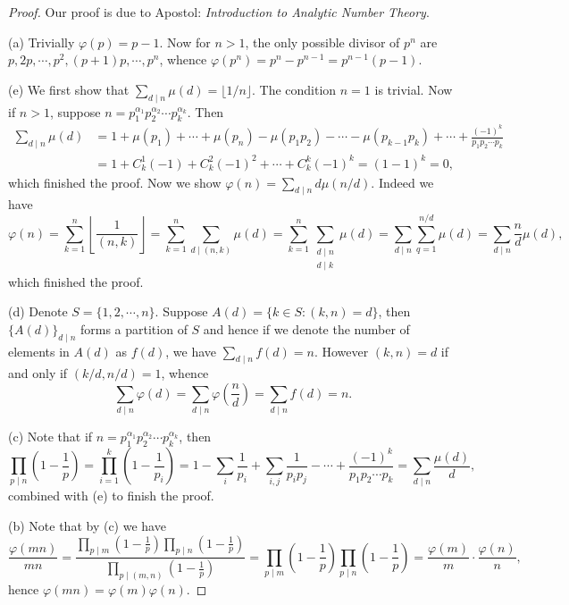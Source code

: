 \begin{proof}
Our proof is due to Apostol: \textit{Introduction to Analytic Number Theory}.\par
(a) Trivially $\varphi(p)=p-1$. Now for $n>1$, the only possible divisor of $p^n$ are $p, 2p,\cdots, p^2, (p+1)p,\cdots, p^n$, whence $\varphi(p^n)=p^n-p^{n-1}=p^{n-1}(p-1)$.\par
(e) We first show that $\sum_{d\mid n}\mu(d)=\lfloor 1/n \rfloor$. The condition $n=1$ is trivial. Now if $n>1$, suppose $n=p_1^{\alpha_1}p_2^{\alpha_2}\cdots p_k^{\alpha_k}$. Then 
$$
\begin{aligned}
\sum_{d\mid n}{\mu \left( d \right)}&=1+\mu \left( p_1 \right) +\cdots +\mu \left( p_n \right) -\mu \left( p_1p_2 \right) -\cdots -\mu \left( p_{k-1}p_k \right) +\cdots +\frac{\left( -1 \right) ^k}{p_1p_2\cdots p_k}
\\
&=1+C_{k}^{1}\left( -1 \right) +C_{k}^{2}\left( -1 \right) ^2+\cdots +C_{k}^{k}\left( -1 \right) ^k=\left( 1-1 \right) ^k=0,
\end{aligned}
$$
which finished the proof. Now we show $\varphi(n)=\sum_{d\mid n}d\mu(n/d)$. Indeed we have 
$$
\varphi \left( n \right) =\sum_{k=1}^n{\left\lfloor \frac{1}{\left( n,k \right)} \right\rfloor}=\sum_{k=1}^n{\sum_{d\mid \left( n,k \right)}{\mu \left( d \right)}}=\sum_{k=1}^n\sum_{\substack{d\mid n \\ d\mid k}}\mu(d)=\sum_{d\mid n}{\sum_{q=1}^{n/d}{\mu \left( d \right)}}=\sum_{d\mid n}{\frac{n}{d}\mu \left( d \right)},
$$
which finished the proof.\par
(d) Denote $S=\{1,2,\cdots,n\}$. Suppose $A(d)=\{k\in S:(k,n)=d\}$, then $\{A(d)\}_{d\mid n}$ forms a partition of $S$ and hence if we denote the number of elements in $A(d)$ as $f(d)$, we have $\sum_{d\mid n}f(d)=n$. However $(k,n)=d$ if and only if $(k/d,n/d)=1$, whence 
$$
\sum_{d\mid n}{\varphi \left( d \right)}=\sum_{d\mid n}{\varphi \left( \frac{n}{d} \right)}=\sum_{d\mid n}{f\left( d \right)}=n.
$$\par
(c) Note that if $n=p_1^{\alpha_1}p_2^{\alpha_2}\cdots p_k^{\alpha_k}$, then 
$$
\prod_{p\mid n}{\left( 1-\frac{1}{p} \right)}=\prod_{i=1}^k{\left( 1-\frac{1}{p_i} \right)}=1-\sum_i{\frac{1}{p_i}}+\sum_{i,j}{\frac{1}{p_ip_j}}-\cdots +\frac{\left( -1 \right) ^k}{p_1p_2\cdots p_k}=\sum_{d\mid n}{\frac{\mu \left( d \right)}{d}},
$$
combined with (e) to finish the proof.\par
(b) Note that by (c) we have 
$$
\frac{\varphi \left( mn \right)}{mn}=\frac{\prod_{p\mid m}{\left( 1-\frac{1}{p} \right)}\prod_{p\mid n}{\left( 1-\frac{1}{p} \right)}}{\prod_{p\mid \left( m,n \right)}{\left( 1-\frac{1}{p} \right)}}=\prod_{p\mid m}{\left( 1-\frac{1}{p} \right)}\prod_{p\mid n}{\left( 1-\frac{1}{p} \right)}=\frac{\varphi \left( m \right)}{m}\cdot \frac{\varphi \left( n \right)}{n},
$$
hence $\varphi(mn)=\varphi(m)\varphi(n)$.
\end{proof}
